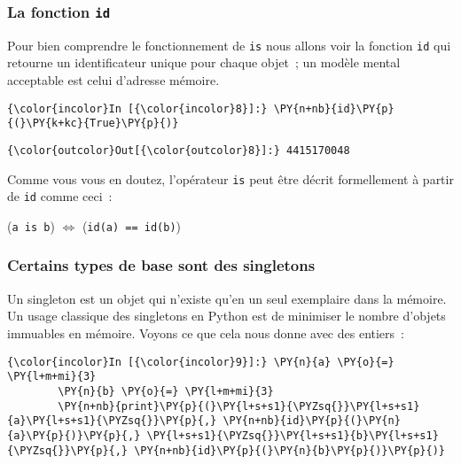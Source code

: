     \hypertarget{la-fonction-id}{%
\subsubsection{\texorpdfstring{La fonction
\texttt{id}}{La fonction id}}\label{la-fonction-id}}

    Pour bien comprendre le fonctionnement de \texttt{is} nous allons voir
la fonction \texttt{id} qui retourne un identificateur unique pour
chaque objet~; un modèle mental acceptable est celui d'adresse mémoire.

    \begin{Verbatim}[commandchars=\\\{\},frame=single,framerule=0.3mm,rulecolor=\color{cellframecolor}]
{\color{incolor}In [{\color{incolor}8}]:} \PY{n+nb}{id}\PY{p}{(}\PY{k+kc}{True}\PY{p}{)}
\end{Verbatim}


\begin{Verbatim}[commandchars=\\\{\},frame=single,framerule=0.3mm,rulecolor=\color{cellframecolor}]
{\color{outcolor}Out[{\color{outcolor}8}]:} 4415170048
\end{Verbatim}
            
    Comme vous vous en doutez, l'opérateur \texttt{is} peut être décrit
formellement à partir de \texttt{id} comme ceci~:

(\texttt{a\ is\ b}) \(\Longleftrightarrow\) (\texttt{id(a)\ ==\ id(b)})

    \hypertarget{certains-types-de-base-sont-des-singletons}{%
\subsubsection{Certains types de base sont des
singletons}\label{certains-types-de-base-sont-des-singletons}}

    Un singleton est un objet qui n'existe qu'en un seul exemplaire dans la
mémoire. Un usage classique des singletons en Python est de minimiser le
nombre d'objets immuables en mémoire. Voyons ce que cela nous donne avec
des entiers~:

    \begin{Verbatim}[commandchars=\\\{\},frame=single,framerule=0.3mm,rulecolor=\color{cellframecolor}]
{\color{incolor}In [{\color{incolor}9}]:} \PY{n}{a} \PY{o}{=} \PY{l+m+mi}{3}
        \PY{n}{b} \PY{o}{=} \PY{l+m+mi}{3}
        \PY{n+nb}{print}\PY{p}{(}\PY{l+s+s1}{\PYZsq{}}\PY{l+s+s1}{a}\PY{l+s+s1}{\PYZsq{}}\PY{p}{,} \PY{n+nb}{id}\PY{p}{(}\PY{n}{a}\PY{p}{)}\PY{p}{,} \PY{l+s+s1}{\PYZsq{}}\PY{l+s+s1}{b}\PY{l+s+s1}{\PYZsq{}}\PY{p}{,} \PY{n+nb}{id}\PY{p}{(}\PY{n}{b}\PY{p}{)}\PY{p}{)}
\end{Verbatim}


